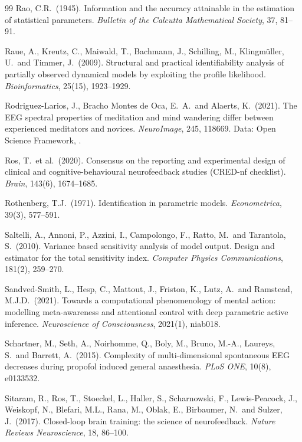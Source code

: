 \documentclass[12pt,a4paper]{article}
\theoremstyle{plain}
\theoremstyle{definition}
\theoremstyle{remark}
\begin{document}
\begin{thebibliography}{99}
Rao, C.R.\ (1945).
Information and the accuracy attainable in the estimation of statistical parameters.
\textit{Bulletin of the Calcutta Mathematical Society}, 37, 81--91.

Raue, A., Kreutz, C., Maiwald, T., Bachmann, J., Schilling, M., Klingm\"uller, U.\ and Timmer, J.\ (2009).
Structural and practical identifiability analysis of partially observed dynamical models by exploiting the profile likelihood.
\textit{Bioinformatics}, 25(15), 1923--1929.

Rodriguez-Larios, J., Bracho Montes de Oca, E.\ A.\ and Alaerts, K.\ (2021).
The EEG spectral properties of meditation and mind wandering differ between experienced meditators and novices.
\textit{NeuroImage}, 245, 118669. Data: Open Science Framework, .

Ros, T.\ et al.\ (2020).
Consensus on the reporting and experimental design of clinical and cognitive-behavioural neurofeedback studies (CRED-nf checklist).
\textit{Brain}, 143(6), 1674--1685.

Rothenberg, T.J.\ (1971).
Identification in parametric models.
\textit{Econometrica}, 39(3), 577--591.

Saltelli, A., Annoni, P., Azzini, I., Campolongo, F., Ratto, M.\ and Tarantola, S.\ (2010).
Variance based sensitivity analysis of model output. Design and estimator for the total sensitivity index.
\textit{Computer Physics Communications}, 181(2), 259--270.

Sandved-Smith, L., Hesp, C., Mattout, J., Friston, K., Lutz, A.\ and Ramstead, M.J.D.\ (2021).
Towards a computational phenomenology of mental action: modelling meta-awareness and attentional control with deep parametric active inference.
\textit{Neuroscience of Consciousness}, 2021(1), niab018.

Schartner, M., Seth, A., Noirhomme, Q., Boly, M., Bruno, M.-A., Laureys, S.\ and Barrett, A.\ (2015).
Complexity of multi-dimensional spontaneous EEG decreases during propofol induced general anaesthesia.
\textit{PLoS ONE}, 10(8), e0133532.

Sitaram, R., Ros, T., Stoeckel, L., Haller, S., Scharnowski, F., Lewis-Peacock, J., Weiskopf, N., Blefari, M.L., Rana, M., Oblak, E., Birbaumer, N.\ and Sulzer, J.\ (2017).
Closed-loop brain training: the science of neurofeedback.
\textit{Nature Reviews Neuroscience}, 18, 86--100.


\end{thebibliography}
\end{document}
